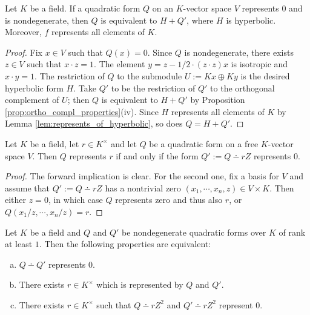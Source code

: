 \begin{proposition}\label{prop:sum_hyperbolic}
\leanok
{}
Let $K$ be a field. If a quadratic form $Q$ on an $K$-vector space $V$ represents $0$ and is nondegenerate, then $Q$ is equivalent to $H + Q'$, where $H$ is hyperbolic. Moreover, $f$ represents all elements of $K$.
\end{proposition}
\begin{proof}
\leanok
{}
Fix $x \in V$ such that $Q(x) = 0$. Since $Q$ is nondegenerate, there exists $z \in V$ such that $x \cdot z = 1$. The element $y = z - 1/2 \cdot(z\cdot z)x$ is isotropic and $x \cdot y = 1$.
The restriction of $Q$ to the submodule $U := Kx \oplus Ky$ is the desired hyperbolic form $H$. Take $Q'$ to be the restriction of $Q'$ to the orthogonal complement of $U$; then $Q$ is equivalent to $H + Q'$ by Proposition \ref{prop:ortho_compl_properties}(iv).
Since $H$ represents all elements of $K$ by Lemma \ref{lem:represents_of_hyperbolic}, so does $Q = H + Q'$.
\end{proof}

\begin{corollary}\label{cor:represents_iff_sub_sub}
\leanok
Let $K$ be a field, let $r \in K^\times$ and let $Q$ be a quadratic form on a free $K$-vector space $V$. Then $Q$ represents $r$ if and only if the form $Q' := Q \dotminus rZ$ represents $0$.
\end{corollary}
\begin{proof}
The forward implication is clear. For the second one, fix a basis for $V$ and assume that $Q' := Q \dotminus rZ$ has a nontrivial zero $(x_1, \cdots, x_n, z) \in V \times K$. Then either $z = 0$, in which case $Q$ represents zero and thus also $r$, or $Q(x_1/z, \cdots, x_n/z) = r$.
\end{proof}

\begin{corollary}\label{cor:prod_isotropic_iff}
\leanok
Let $K$ be a field and $Q$ and $Q'$ be nondegenerate quadratic forms over $K$ of rank at least $1$. Then the following properties are equivalent:
\begin{enumerate}[a)]
\item $Q \dotminus Q'$ represents $0$.
\item There exists $r \in K^\times$ which is represented by $Q$ and $Q'$.
\item There exists $r \in K^\times$ such that $Q \dotminus rZ^2$ and $Q' \dotminus rZ^2$ represent $0$.
\end{enumerate}
\end{corollary}

